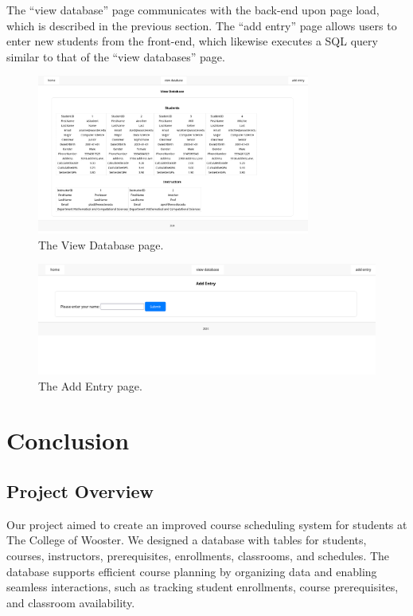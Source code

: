 \documentclass[12pt]{article}
\begin{document}
The “view database” page communicates with the back-end upon page load, which is described in the previous section. The “add entry” page allows users to enter new students from the front-end, which likewise executes a SQL query similar to that of the “view databases” page.

\begin{figure}[h]
    \centering
    \includegraphics[width=0.8\textwidth]{images/img2.png}
    \caption{The View Database page.}
    \label{fig:mesh1}
\end{figure}


\begin{figure}[h]
    \centering
    \includegraphics[width=1\textwidth]{images/img3.png}
    \caption{The Add Entry page.}
    \label{fig:mesh1}
\end{figure}

\newpage

\section{Conclusion}
\subsection{Project Overview}
Our project aimed to create an improved course scheduling system for students at The College of Wooster. We designed a database with tables for students, courses, instructors, prerequisites, enrollments, classrooms, and schedules. The database supports efficient course planning by organizing data and enabling seamless interactions, such as tracking student enrollments, course prerequisites, and classroom availability.
\end{document}
